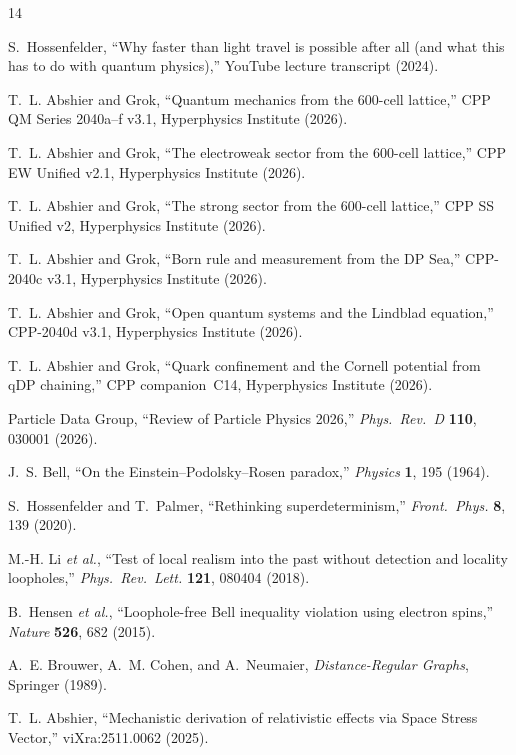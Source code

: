 \documentclass[11pt,a4paper]{article}
\begin{document}

\begin{thebibliography}{14}

S.~Hossenfelder,
``Why faster than light travel is possible after all (and what this
has to do with quantum physics),''
YouTube lecture transcript (2024).

T.~L. Abshier and Grok,
``Quantum mechanics from the 600-cell lattice,''
CPP QM Series 2040a--f v3.1, Hyperphysics Institute (2026).

T.~L. Abshier and Grok,
``The electroweak sector from the 600-cell lattice,''
CPP EW Unified v2.1, Hyperphysics Institute (2026).

T.~L. Abshier and Grok,
``The strong sector from the 600-cell lattice,''
CPP SS Unified v2, Hyperphysics Institute (2026).

T.~L. Abshier and Grok,
``Born rule and measurement from the DP Sea,''
CPP-2040c v3.1, Hyperphysics Institute (2026).

T.~L. Abshier and Grok,
``Open quantum systems and the Lindblad equation,''
CPP-2040d v3.1, Hyperphysics Institute (2026).

T.~L. Abshier and Grok,
``Quark confinement and the Cornell potential from qDP chaining,''
CPP companion~C14, Hyperphysics Institute (2026).

Particle Data Group,
``Review of Particle Physics 2026,''
\textit{Phys.\ Rev.\ D} \textbf{110}, 030001 (2026).

J.~S. Bell,
``On the Einstein--Podolsky--Rosen paradox,''
\textit{Physics} \textbf{1}, 195 (1964).

S.~Hossenfelder and T.~Palmer,
``Rethinking superdeterminism,''
\textit{Front.\ Phys.} \textbf{8}, 139 (2020).

M.-H. Li \textit{et al.},
``Test of local realism into the past without detection and
locality loopholes,''
\textit{Phys.\ Rev.\ Lett.} \textbf{121}, 080404 (2018).

B.~Hensen \textit{et al.},
``Loophole-free Bell inequality violation using electron spins,''
\textit{Nature} \textbf{526}, 682 (2015).

A.~E. Brouwer, A.~M. Cohen, and A.~Neumaier,
\textit{Distance-Regular Graphs}, Springer (1989).

T.~L. Abshier,
``Mechanistic derivation of relativistic effects via Space Stress
Vector,''
viXra:2511.0062 (2025).

\end{thebibliography}
\end{document}
